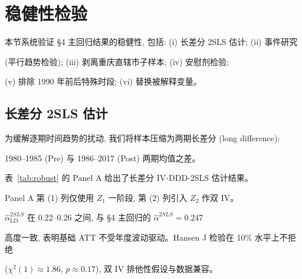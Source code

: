 






\section{稳健性检验}\label{sec:robust}



\begin{refcheck}

本节系统验证 §4 主回归结果的稳健性, 包括: (i) 长差分 2SLS 估计; (ii) 事件研究

(平行趋势检验); (iii) 剥离重庆直辖市子样本; (iv) 安慰剂检验;

(v) 排除 1990 年前后特殊时段; (vi) 替换被解释变量。

\end{refcheck}



\subsection{长差分 2SLS 估计}



为缓解逐期时间趋势的扰动, 我们将样本压缩为两期长差分 (long difference):

1980--1985 (Pre) 与 1986--2017 (Post) 两期均值之差。

表~\ref{tab:robust} 的 Panel A 给出了长差分 IV-DDD-2SLS 估计结果。







Panel A 第 (1) 列仅使用 $Z_1$ 一阶段, 第 (2) 列引入 $Z_2$ 作双 IV。

$\hat{\alpha}_{\mathrm{LD}}^{2SLS}$ 在 0.22--0.26 之间, 与 §4 主回归的 $\hat{\alpha}^{2SLS}=0.247$

高度一致, 表明基础 ATT 不受年度波动驱动。Hansen J 检验在 10\% 水平上不拒绝

($\chi^2(1)\approx 1.86$, $p\approx 0.17$), 双 IV 排他性假设与数据兼容。



